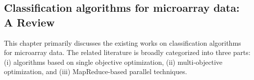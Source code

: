\begin{spacing}{1.3}
\chapter{Classification algorithms for microarray data: A Review} %

This chapter primarily discusses the existing works on classification algorithms for microarray data. The related literature is broadly categorized into three parts: (i) algorithms based on single objective optimization, (ii) multi-objective optimization, and (iii) MapReduce-based parallel techniques. 



 










 

\end{spacing}


